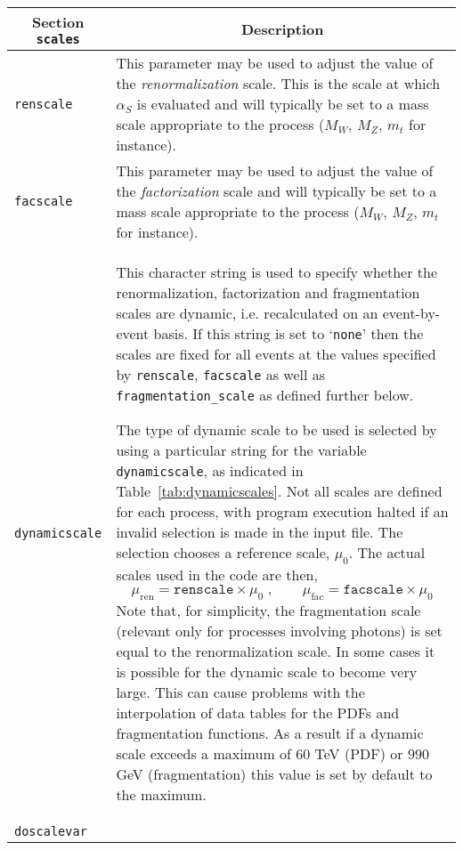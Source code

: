 	\begin{longtable}{p{1.5cm}p{12cm}}
		\hline
		\multicolumn{1}{c}{{\textbf{Section} \texttt{scales}}} & \multicolumn{1}{c}{{\textbf{Description}}} \\ 
		\hline
		\texttt{renscale} &
		This parameter may be used to adjust the value
		of the {\it renormalization} scale. This is the scale
		at which $\alpha_S$ is evaluated and will typically be set to
		a mass scale appropriate to the process ($M_W$, $M_Z$, $m_t$ for
		instance). \\
		\texttt{facscale} &
		This parameter may be used to adjust the value
		of the {\it factorization} scale and will typically be set to
		a mass scale appropriate to the process ($M_W$, $M_Z$, $m_t$ for
		instance). \\
		\texttt{dynamicscale} &
		This character string is used to specify whether
		the renormalization, factorization and fragmentation scales are dynamic, i.e. recalculated
		on an event-by-event basis. If this string is set to `{\tt none}' then the scales
		are fixed for all events at the values	specified by {\tt renscale}, {\tt facscale}
		as well as \texttt{fragmentation\_scale} as defined further below.
		
		The type of dynamic scale to be used is selected by using a particular string
		for the variable {\tt dynamicscale}, as indicated in Table~\ref{tab:dynamicscales}.
		Not all scales are defined for each process, with program execution halted if
		an invalid selection is made in the input file.
		The selection chooses a reference scale, $\mu_0$. The actual scales used in
		the code are then,
		\begin{equation}
		\mu_{\mathrm{ren}} = \texttt{renscale} \times \mu_0 \;, \qquad
		\mu_{\mathrm{fac}} = \texttt{facscale} \times \mu_0
		\label{eq:dynscale}
		\end{equation}
		Note that, for simplicity, the fragmentation scale (relevant only for processes
		involving photons) is set equal to the renormalization scale.
		In some cases it is possible for the dynamic scale to become very large. This can cause problems 
		with the interpolation of data tables for the PDFs and fragmentation functions. As a result if a dynamic scale 
		exceeds a maximum of $60$ TeV (PDF) or $990$ GeV (fragmentation) this value is set by default to the maximum. 	
		\\
		\texttt{doscalevar} &
		

\end{longtable}
